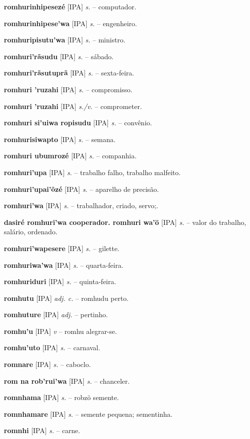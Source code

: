 \textbf{romhurinhipesezé} [IPA] \textit{s.} -- computador.

\textbf{romhurinhipese'wa} [IPA] \textit{s.} -- engenheiro.

\textbf{romhuripisutu'wa} [IPA] \textit{s.} -- ministro.

\textbf{romhuri'rãsudu} [IPA] \textit{s.} -- sábado.

\textbf{romhuri'rãsutuprã} [IPA] \textit{s.} -- sexta-feira.

\textbf{romhuri 'ruzahi} [IPA] \textit{s.} -- compromisso.

\textbf{romhuri 'ruzahi} [IPA] \textit{s./v.} -- comprometer.

\textbf{romhuri si'uiwa ropisudu} [IPA] \textit{s.} -- convênio.

\textbf{romhurisiwapto} [IPA] \textit{s.} -- semana.

\textbf{romhuri ubumrozé} [IPA] \textit{s.} -- companhia.

\textbf{romhuri'upa} [IPA] \textit{s.} -- trabalho falho, trabalho malfeito.

\textbf{romhuri'upai'õzé} [IPA] \textit{s.} -- aparelho de precisão.

\textbf{romhuri'wa} [IPA] \textit{s.} -- trabalhador, criado, servo;.

\textbf{dasiré romhuri'wa cooperador. romhuri wa'ö} [IPA] \textit{s.} -- valor do trabalho, salário, ordenado.

\textbf{romhuri'wapesere} [IPA] \textit{s.} -- gilette.

\textbf{romhuriwa'wa} [IPA] \textit{s.} -- quarta-feira.

\textbf{romhuriduri} [IPA] \textit{s.} -- quinta-feira.

\textbf{romhutu} [IPA] \textit{adj. c.} -- romhudu perto.

\textbf{romhuture} [IPA] \textit{adj.} -- pertinho.

\textbf{romhu'u} [IPA] \textit{v} -- romhu alegrar-se.

\textbf{romhu'uto} [IPA] \textit{s.} -- carnaval.

\textbf{romnare} [IPA] \textit{s.} -- caboclo.

\textbf{rom na rob'rui'wa} [IPA] \textit{s.} -- chanceler.

\textbf{romnhama} [IPA] \textit{s.} -- robzö semente.

\textbf{romnhamare} [IPA] \textit{s.} -- semente pequena; sementinha.

\textbf{romnhi} [IPA] \textit{s.} -- carne.

